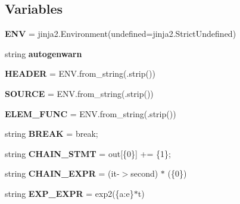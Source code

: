 \subsection*{Variables}
\begin{DoxyCompactItemize}
\item 
{\bfseries E\+NV} = jinja2.\+Environment(undefined=jinja2.\+Strict\+Undefined)\hypertarget{namespacedecaygen_adb67ac7d20fa38139d16aeb73fe81551}{}\label{namespacedecaygen_adb67ac7d20fa38139d16aeb73fe81551}

\item 
string {\bfseries autogenwarn}
\item 
{\bfseries H\+E\+A\+D\+ER} = E\+N\+V.\+from\+\_\+string(.strip())\hypertarget{namespacedecaygen_ac27265656055f92a90cc2c29370319b0}{}\label{namespacedecaygen_ac27265656055f92a90cc2c29370319b0}

\item 
{\bfseries S\+O\+U\+R\+CE} = E\+N\+V.\+from\+\_\+string(.strip())\hypertarget{namespacedecaygen_a1bbf7060b1842fccea26e974565b7fc3}{}\label{namespacedecaygen_a1bbf7060b1842fccea26e974565b7fc3}

\item 
{\bfseries E\+L\+E\+M\+\_\+\+F\+U\+NC} = E\+N\+V.\+from\+\_\+string(.strip())\hypertarget{namespacedecaygen_ada7f55c790eb73ce276456c98a3d64eb}{}\label{namespacedecaygen_ada7f55c790eb73ce276456c98a3d64eb}

\item 
string {\bfseries B\+R\+E\+AK} = \textquotesingle{} break;\textquotesingle{}\hypertarget{namespacedecaygen_a08753ef88ec65af70e708cf824b1e841}{}\label{namespacedecaygen_a08753ef88ec65af70e708cf824b1e841}

\item 
string {\bfseries C\+H\+A\+I\+N\+\_\+\+S\+T\+MT} = \textquotesingle{} out\mbox{[}\{0\}\mbox{]} += \{1\};\textquotesingle{}\hypertarget{namespacedecaygen_a5893c4ad03355bc4894f6b94e14626d9}{}\label{namespacedecaygen_a5893c4ad03355bc4894f6b94e14626d9}

\item 
string {\bfseries C\+H\+A\+I\+N\+\_\+\+E\+X\+PR} = \textquotesingle{}(it-\/$>$second) $\ast$ (\{0\})\textquotesingle{}\hypertarget{namespacedecaygen_ad96ae69f060f308e4930853633236468}{}\label{namespacedecaygen_ad96ae69f060f308e4930853633236468}

\item 
string {\bfseries E\+X\+P\+\_\+\+E\+X\+PR} = \textquotesingle{}exp2(\{a\+:e\}$\ast$t)\textquotesingle{}\hypertarget{namespacedecaygen_a0eb244c63eafc1a6cd93d02cb8f49723}{}\label{namespacedecaygen_a0eb244c63eafc1a6cd93d02cb8f49723}


\end{DoxyCompactItemize}
